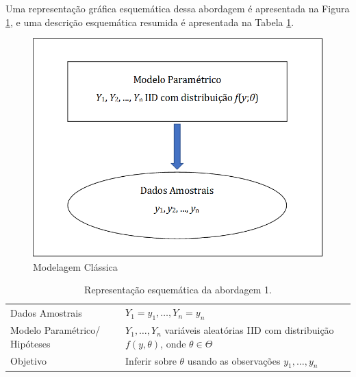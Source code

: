\documentclass[]{book}
\theoremstyle{definition}
\theoremstyle{definition}
\theoremstyle{definition}
\theoremstyle{remark}
\begin{document}
Uma representação gráfica esquemática dessa abordagem é apresentada na
Figura \ref{fig:modclas}, e uma descrição esquemática resumida é
apresentada na Tabela \ref{tab:modelclass}.

\begin{figure}
\includegraphics[width=10.6in]{Figuras/Figura2.1} \caption{Modelagem Clássica}\label{fig:modclas}
\end{figure}

\begin{longtable}[]{@{}ll@{}}
\caption{\label{tab:modelclass} Representação esquemática da abordagem
1.}\tabularnewline
\toprule
\begin{minipage}[t]{0.29\columnwidth}\raggedright\strut
Dados Amostrais\strut
\end{minipage} & \begin{minipage}[t]{0.60\columnwidth}\raggedright\strut
\(Y_1=y_1,\ldots, Y_n=y_n\)\strut
\end{minipage}\tabularnewline
\begin{minipage}[t]{0.29\columnwidth}\raggedright\strut
Modelo Paramétrico/ Hipóteses\strut
\end{minipage} & \begin{minipage}[t]{0.60\columnwidth}\raggedright\strut
\(Y_1,\ldots,Y_n\) variáveis aleatórias IID com distribuição
\(f(y,\theta)\), onde \(\theta \in \Theta\)\strut
\end{minipage}\tabularnewline
\begin{minipage}[t]{0.29\columnwidth}\raggedright\strut
Objetivo\strut
\end{minipage} & \begin{minipage}[t]{0.60\columnwidth}\raggedright\strut
Inferir sobre \(\theta\) usando as observações \(y_1, \ldots,y_n\)\strut
\end{minipage}\tabularnewline
\bottomrule
\end{longtable}
\end{document}
